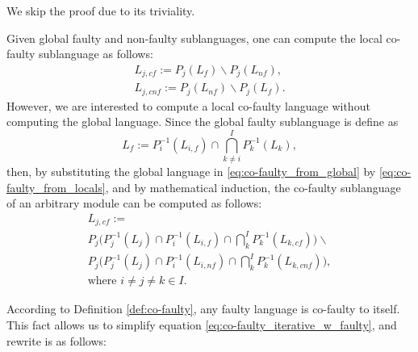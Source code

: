 \documentclass[a4paper, 10pt, conference]{ieeeconf}
\begin{document}
We skip the proof due to its triviality. 

Given global faulty and non-faulty sublanguages, one can compute the local
co-faulty sublanguage as follows:
\begin{equation}
\label{eq:co-faulty_from_global}
	\begin{array}{l}
		L_{j,cf} := P_j(L_f) \backslash P_j(L_{nf}),\\ 
		L_{j,cnf} := P_j(L_{nf}) \backslash P_j(L_{f}).	
	\end{array}
\end{equation}
However, we are interested to compute a local co-faulty
language without computing the global language. Since the global
faulty sublanguage is define as
\begin{equation}
\label{eq:co-faulty_from_locals}
	L_f := P_i^{-1}(L_{i,f}) \cap \bigcap_{k\neq
	i}^I P_k^{-1}(L_k),
\end{equation}
then, by substituting the global language in \ref{eq:co-faulty_from_global} by
\ref{eq:co-faulty_from_locals}, and by mathematical induction, the co-faulty
sublanguage of an arbitrary module can be computed as follows:
\begin{equation}
\label{eq:co-faulty_iterative_w_faulty}
	\begin{array}{l}
		L_{j,cf} := 
		\\
		P_j\Big(P_j^{-1}(L_j) \cap P_i^{-1}(L_{i,f})\cap 
		\bigcap_k^I P_k^{-1}(L_{k,cf})\Big) \backslash 
		\\
		P_j\Big(P_j^{-1}(L_j) \cap P_i^{-1}(L_{i,nf})\cap 
		\bigcap_k^I P_k^{-1}(L_{k,cnf})\Big),
		\\ 
		\textrm{where } i\neq j\neq k \in I.
	\end{array}
\end{equation}

According to Definition \ref{def:co-faulty}, any faulty language is co-faulty to
itself. This fact allows us to simplify equation
\ref{eq:co-faulty_iterative_w_faulty}, and rewrite is as follows:
\end{document}
